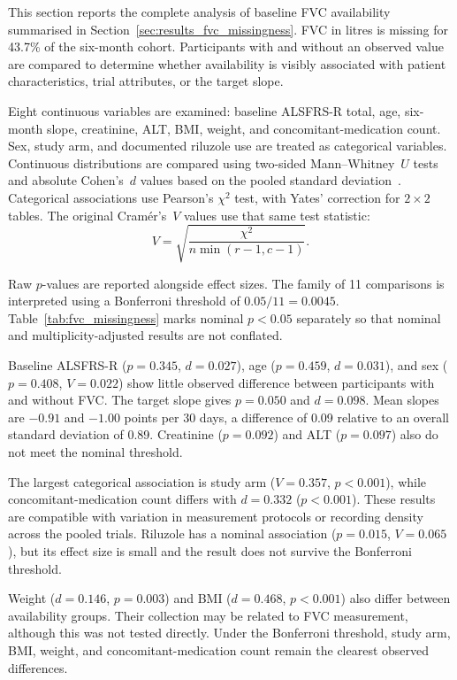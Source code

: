 This section reports the complete analysis of baseline \gls{FVC} availability summarised in Section~\ref{sec:results_fvc_missingness}. FVC in litres is missing for 43.7\% of the six-month cohort. Participants with and without an observed value are compared to determine whether availability is visibly associated with patient characteristics, trial attributes, or the target slope.

Eight continuous variables are examined: baseline \gls{ALSFRS-R} total, age, six-month slope, creatinine, \gls{ALT}, \gls{BMI}, weight, and concomitant-medication count. Sex, study arm, and documented riluzole use are treated as categorical variables. Continuous distributions are compared using two-sided Mann--Whitney~$U$ tests and absolute Cohen's~$d$ values based on the pooled standard deviation~\cite{cohen1988statistical}. Categorical associations use Pearson's $\chi^2$ test, with Yates' correction for $2\times2$ tables. The original Cram\'er's~$V$ values use that same test statistic:
\[
  V=\sqrt{\frac{\chi^2}{n\min(r-1,c-1)}}.
\]

Raw $p$-values are reported alongside effect sizes. The family of 11 comparisons is interpreted using a Bonferroni threshold of $0.05/11=0.0045$. Table~\ref{tab:fvc_missingness} marks nominal $p<0.05$ separately so that nominal and multiplicity-adjusted results are not conflated.


\break

Baseline \gls{ALSFRS-R} ($p=0.345$, $d=0.027$), age ($p=0.459$, $d=0.031$), and sex ($p=0.408$, $V=0.022$) show little observed difference between participants with and without FVC. The target slope gives $p=0.050$ and $d=0.098$. Mean slopes are $-0.91$ and $-1.00$ points per 30 days, a difference of 0.09 relative to an overall standard deviation of 0.89. Creatinine ($p=0.092$) and ALT ($p=0.097$) also do not meet the nominal threshold.

The largest categorical association is study arm ($V=0.357$, $p<0.001$), while concomitant-medication count differs with $d=0.332$ ($p<0.001$). These results are compatible with variation in measurement protocols or recording density across the pooled trials. Riluzole has a nominal association ($p=0.015$, $V=0.065$), but its effect size is small and the result does not survive the Bonferroni threshold.

Weight ($d=0.146$, $p=0.003$) and BMI ($d=0.468$, $p<0.001$) also differ between availability groups. Their collection may be related to FVC measurement, although this was not tested directly. Under the Bonferroni threshold, study arm, BMI, weight, and concomitant-medication count remain the clearest observed differences.

